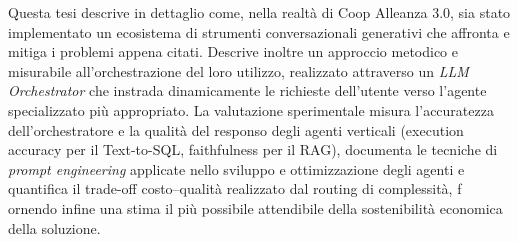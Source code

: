 Questa tesi descrive in dettaglio come, nella realtà di Coop Alleanza 3.0, sia
stato implementato un ecosistema di strumenti conversazionali generativi che
affronta e mitiga i problemi appena citati. Descrive inoltre un approccio metodico
e misurabile all'orchestrazione del loro utilizzo, realizzato attraverso un
\emph{LLM Orchestrator} che instrada dinamicamente le richieste dell'utente verso
l'agente specializzato più appropriato. La valutazione sperimentale misura l'accuratezza
dell'orchestratore e la qualità del responso degli agenti verticali (execution accuracy
per il Text-to-SQL, faithfulness per il RAG), documenta le tecniche di \emph{prompt
engineering} applicate nello sviluppo e ottimizzazione degli agenti 
e quantifica il trade-off costo--qualità realizzato dal routing di complessità, f
ornendo infine una stima il più possibile attendibile della sostenibilità 
economica della soluzione.

\clearpage
